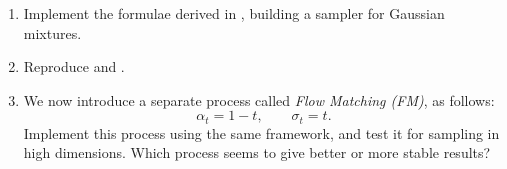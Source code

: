 \documentclass[../../book-main.tex]{subfiles}
\begin{document}
\begin{exercise}\label{exercise:implement_denoising_processes}
\begin{enumerate}
    \item Implement the formulae derived in , building a sampler for Gaussian mixtures.
    \item Reproduce  and .
    \item We now introduce a separate process called \textit{Flow Matching (FM)}, as follows:
    \begin{equation}
        \alpha_{t} = 1 - t, \qquad \sigma_{t} = t.
    \end{equation}
    Implement this process using the same framework, and test it for sampling in high dimensions. Which process seems to give better or more stable results?
\end{enumerate}
\end{exercise}




 
\end{document}
